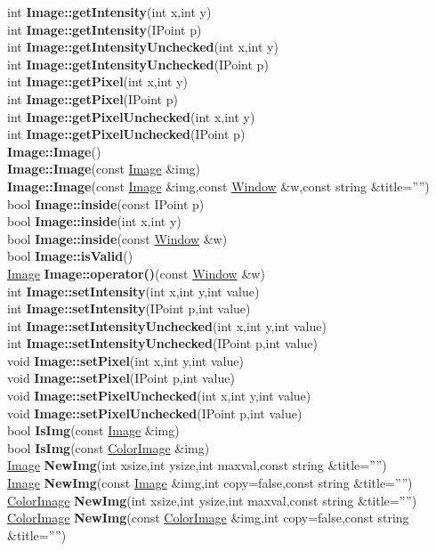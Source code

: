 \documentclass[10pt,titlepage]{article}
\def\functionlistentry#1#2#3#4#5#6{\noindent #1 {\bf #2}(#3) \dotfill #6\\}
\begin{document}
{{\functionlistentry{int}{Image::getIntensity}{int x,int y}{42}{Images}{}
\functionlistentry{int}{Image::getIntensity}{IPoint p}{43}{Images}{}
\functionlistentry{int}{Image::getIntensityUnchecked}{int x,int y}{44}{Images}{}
\functionlistentry{int}{Image::getIntensityUnchecked}{IPoint p}{45}{Images}{}
\functionlistentry{int}{Image::getPixel}{int x,int y}{34}{Images}{}
\functionlistentry{int}{Image::getPixel}{IPoint p}{35}{Images}{}
\functionlistentry{int}{Image::getPixelUnchecked}{int x,int y}{38}{Images}{}
\functionlistentry{int}{Image::getPixelUnchecked}{IPoint p}{39}{Images}{}
\functionlistentry{}{Image::Image}{}{3}{Images}{}
\functionlistentry{}{Image::Image}{const \hyperlink{Image}{Image} \&img}{4}{Images}{}
\functionlistentry{}{Image::Image}{const \hyperlink{Image}{Image} \&img,const \hyperlink{Window}{Window} \&w,const string \&title=''''}{30}{Images}{}
\functionlistentry{bool}{Image::inside}{const IPoint p}{58}{Images}{}
\functionlistentry{bool}{Image::inside}{int x,int y}{59}{Images}{}
\functionlistentry{bool}{Image::inside}{const \hyperlink{Window}{Window} \&w}{60}{Images}{}
\functionlistentry{bool}{Image::isValid}{}{13}{Images}{}
\functionlistentry{\hyperlink{Image}{Image}}{Image::operator()}{const \hyperlink{Window}{Window} \&w}{31}{Images}{}
\functionlistentry{int}{Image::setIntensity}{int x,int y,int value}{54}{Images}{}
\functionlistentry{int}{Image::setIntensity}{IPoint p,int value}{55}{Images}{}
\functionlistentry{int}{Image::setIntensityUnchecked}{int x,int y,int value}{56}{Images}{}
\functionlistentry{int}{Image::setIntensityUnchecked}{IPoint p,int value}{57}{Images}{}
\functionlistentry{void}{Image::setPixel}{int x,int y,int value}{46}{Images}{}
\functionlistentry{void}{Image::setPixel}{IPoint p,int value}{47}{Images}{}
\functionlistentry{void}{Image::setPixelUnchecked}{int x,int y,int value}{50}{Images}{}
\functionlistentry{void}{Image::setPixelUnchecked}{IPoint p,int value}{51}{Images}{}
\functionlistentry{bool}{IsImg}{const \hyperlink{Image}{Image} \&img}{14}{Images}{}
\functionlistentry{bool}{IsImg}{const \hyperlink{ColorImage}{ColorImage} \&img}{26}{Images}{}
\functionlistentry{\hyperlink{Image}{Image}}{NewImg}{int xsize,int ysize,int maxval,const string \&title=''''}{10}{Images}{}
\functionlistentry{\hyperlink{Image}{Image}}{NewImg}{const \hyperlink{Image}{Image} \&img,int copy=false,const string \&title=''''}{11}{Images}{}
\functionlistentry{\hyperlink{ColorImage}{ColorImage}}{NewImg}{int xsize,int ysize,int maxval,const string \&title=''''}{22}{Images}{}
\functionlistentry{\hyperlink{ColorImage}{ColorImage}}{NewImg}{const \hyperlink{ColorImage}{ColorImage} \&img,int copy=false,const string \&title=''''}{23}{Images}{}
}}
\end{document}
